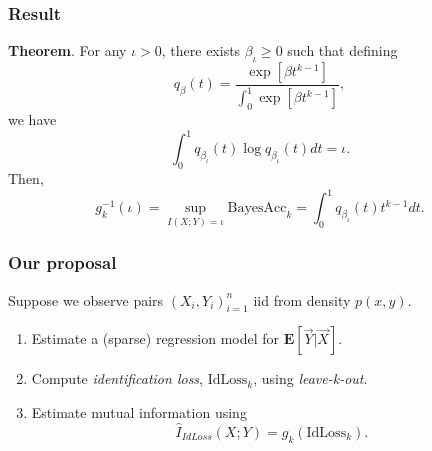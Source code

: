 \documentclass{beamer}
\newcommand{\E}{\textbf{E}}
\begin{document}
\begin{frame}
\frametitle{Result}
\textbf{Theorem}.
For any $\iota > 0$, there exists $\beta_\iota \geq 0$ such that defining
\[
q_\beta(t) = \frac{\exp[\beta t^{k-1}]}{\int_0^1 \exp[\beta t^{k-1}]},
\]
we have
\[
\int_0^1 q_{\beta_\iota}(t) \log q_{\beta_\iota}(t) dt = \iota.
\]
Then,
\[
g_k^{-1}(\iota) = \sup_{I(X; Y) = \iota} \text{BayesAcc}_k = \int_0^1 q_{\beta_\iota}(t) t^{k-1} dt.
\]
\end{frame}

\begin{frame}
\frametitle{Our proposal}
Suppose we observe pairs $(X_i,Y_i)_{i=1}^n$ iid from density $p(x, y)$.
\begin{enumerate}
\item Estimate a (sparse) regression model for $\E[\vec{Y}|\vec{X}]$.
\item Compute \emph{identification loss}, $\text{IdLoss}_k$, using \emph{leave-k-out}.
\item Estimate mutual information using
\[
\hat{I}_{IdLoss}(X; Y) = g_k(\text{IdLoss}_k).
\]
\end{enumerate}
\end{frame}



\end{document}
